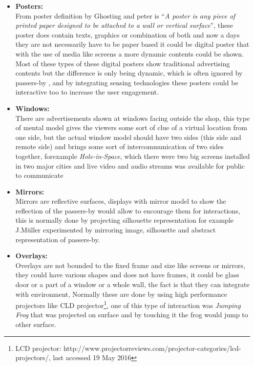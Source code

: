 \begin{itemize}
\item \textbf{Posters: } \\
From poster definition by Ghosting and peter\cite{Poster_Ad} is ``\emph{A poster is any piece of printed paper designed to be attached to a wall or vertical surface}'', these poster does contain texts, graphics or combination of both and now a days they are not necessarily have to be paper based it could be digital poster that with the use of media like screens a more dynamic contents could be shown. Most of these types of these digital posters show traditional advertising contents but the difference is only being dynamic, which is often ignored by passers-by \cite{display_blindness}, and by integrating sensing technologies these posters could be interactive too to increase the user engagement.


\item \textbf{Windows: } \\
There are advertisements shown at windows facing outside the shop, this type of mental model gives the viewers some sort of clue of a virtual location from one side, but the actual window model should have two sides (this side and remote side) and brings some sort of intercommunication of two sides together, forexample \emph{Hole-in-Space}\cite{hole_space}, which there were two big screens installed in two major cities and live video and audio streams was available for public to communicate 

\item \textbf{Mirrors: } \\
Mirrors are reflective surfaces, displays with mirror model to show the reflection of the passers-by would allow to encourage them for interactions, this is normally done by projecting silhouette representation for example J.Müller \cite{LookingGlass} experimented by mirroring image, silhouette and abstract representation of passers-by.

\item \textbf{Overlays: } \\
Overlays are not bounded to the fixed frame and size like screens or mirrors, they could have various shapes and does not have frames, it could be glass door or a part of a window or a whole wall, the fact is that they can integrate with environment, Normally these are done by using high performance projectors like CLD projector\footnote{LCD projector: http://www.projectorreviews.com/projector-categories/lcd-projectors/, last accessed 19 May 2016}, one of this type of interaction was \emph{Jumping Frog} \cite{ meme-tags}that was projected on surface and by touching it the frog would jump to other surface. 



\end{itemize}



